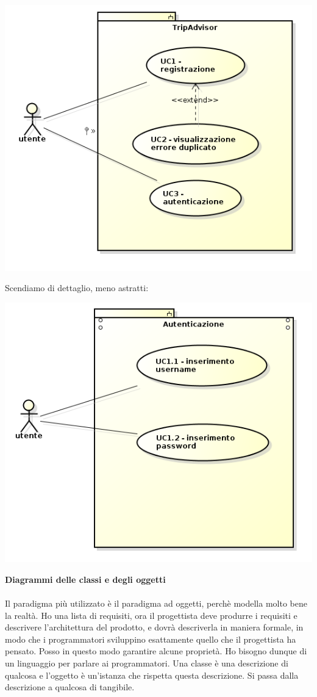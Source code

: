 \begin{center}

\includegraphics[width=0.75\columnwidth]{img4} %

\end{center}

Scendiamo di dettaglio, meno astratti:

\begin{center}

\includegraphics[width=0.75\columnwidth]{img5} %

\end{center}

\textbf{Diagrammi delle classi e degli oggetti}\\\\

Il paradigma più utilizzato è il paradigma ad oggetti, perchè modella molto bene la realtà. Ho una lista di requisiti, ora il progettista deve produrre i requisiti e descrivere l'architettura del prodotto, e dovrà descriverla in maniera formale, in modo che i programmatori sviluppino esattamente quello che il progettista ha pensato. Posso in questo modo garantire alcune proprietà. Ho bisogno dunque di un linguaggio per parlare ai programmatori. Una classe è una descrizione di qualcosa e l'oggetto è un'istanza che rispetta questa descrizione. Si passa dalla descrizione a qualcosa di tangibile.

